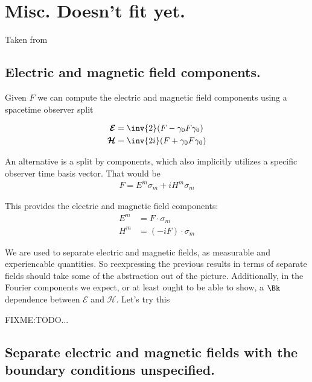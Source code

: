 \documentclass{article}
\title{}
\author{Peeter Joot}
\date{ Feb dd, 2009.  Last Revision: $Date: 2009/02/07 15:20:07 $ }
\newcommand{\EE}[0]{\boldsymbol{\mathcal{E}}}
\newcommand{\HH}[0]{\boldsymbol{\mathcal{H}}}
\begin{document}
\maketitle{}

\tableofcontents

\section{}

\section{ Misc.  Doesn't fit yet. }

Taken from \cite{PJFourierVacuum}

\subsection{ Electric and magnetic field components. }

Given $F$ we can compute the electric and magnetic field components using a spacetime observer split

\begin{align*}
\EE &= \inv{2}(F - \gamma_0 F \gamma_0 ) \\
\HH &= \inv{2i}(F + \gamma_0 F \gamma_0 ) \\
\end{align*}

An alternative is a split by components, which also implicitly utilizes
a specific observer time basis vector.  That would be
\begin{align*}
F = E^m \sigma_m + i H^m \sigma_m
\end{align*}

This provides the electric and magnetic field components:
\begin{align*}
E^m &= F \cdot \sigma_m \\
H^m &= (-i F) \cdot \sigma_m
\end{align*}

We are used to separate electric and magnetic fields, as measurable and experiencable quantities.  So reexpressing the previous results 
in terms of separate fields should take some of the abstraction out of the picture.  Additionally, in the Fourier components we expect, or at least ought to be able to show, a $\Bk$ dependence between $\EE$ and $\HH$.  Let's try this

FIXME:TODO...

\subsection{ Separate electric and magnetic fields with the boundary conditions unspecified. }
\end{document}
